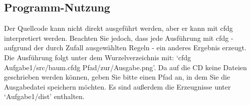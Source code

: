 \lstset{language=cfdg}
\lstset{basicstyle=\footnotesize}


\subsection{Programm-Nutzung}
Der Quellcode kann nicht direkt ausgeführt werden, aber er kann mit cfdg interpretiert werden.
Beachten Sie jedoch, dass jede Ausführung mit cfdg - aufgrund der durch Zufall ausgewählten Regeln - ein anderes Ergebnis erzeugt.
Die Ausführung folgt unter dem Wurzelverzeichnis mit: `cfdg Aufgabe1/src/baum.cfdg Pfad/zur/Ausgabe.png'.
Da auf die CD keine Dateien geschrieben werden können, geben Sie bitte einen Pfad an, in dem Sie die Ausgabedatei speichern möchten.
Es sind außerdem die Erzeugnisse unter `Aufgabe1/dist' enthalten.